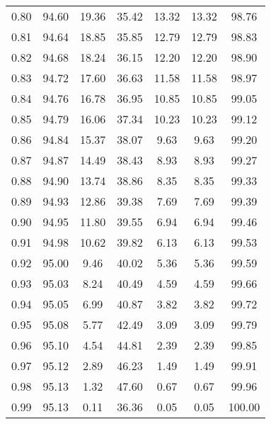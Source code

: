 \begin{tabular}{|c|c|c|c|c|c|c|}
      0.80 &     94.60 &     19.36 &      35.42 &   13.32 &      13.32 &         98.76 \\
      0.81 &     94.64 &     18.85 &      35.85 &   12.79 &      12.79 &         98.83 \\
      0.82 &     94.68 &     18.24 &      36.15 &   12.20 &      12.20 &         98.90 \\
      0.83 &     94.72 &     17.60 &      36.63 &   11.58 &      11.58 &         98.97 \\
      0.84 &     94.76 &     16.78 &      36.95 &   10.85 &      10.85 &         99.05 \\
      0.85 &     94.79 &     16.06 &      37.34 &   10.23 &      10.23 &         99.12 \\
      0.86 &     94.84 &     15.37 &      38.07 &    9.63 &       9.63 &         99.20 \\
      0.87 &     94.87 &     14.49 &      38.43 &    8.93 &       8.93 &         99.27 \\
      0.88 &     94.90 &     13.74 &      38.86 &    8.35 &       8.35 &         99.33 \\
      0.89 &     94.93 &     12.86 &      39.38 &    7.69 &       7.69 &         99.39 \\
      0.90 &     94.95 &     11.80 &      39.55 &    6.94 &       6.94 &         99.46 \\
      0.91 &     94.98 &     10.62 &      39.82 &    6.13 &       6.13 &         99.53 \\
      0.92 &     95.00 &      9.46 &      40.02 &    5.36 &       5.36 &         99.59 \\
      0.93 &     95.03 &      8.24 &      40.49 &    4.59 &       4.59 &         99.66 \\
      0.94 &     95.05 &      6.99 &      40.87 &    3.82 &       3.82 &         99.72 \\
      0.95 &     95.08 &      5.77 &      42.49 &    3.09 &       3.09 &         99.79 \\
      0.96 &     95.10 &      4.54 &      44.81 &    2.39 &       2.39 &         99.85 \\
      0.97 &     95.12 &      2.89 &      46.23 &    1.49 &       1.49 &         99.91 \\
      0.98 &     95.13 &      1.32 &      47.60 &    0.67 &       0.67 &         99.96 \\
      0.99 &     95.13 &      0.11 &      36.36 &    0.05 &       0.05 &        100.00 \\
\bottomrule
\end{tabular}
